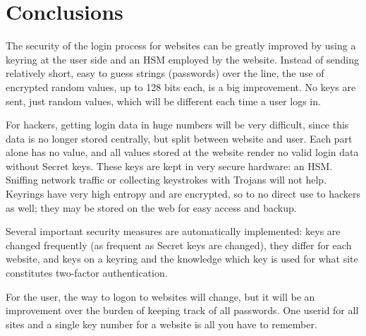 \section{Conclusions}
The security of the login process for websites can be greatly improved by using a keyring at the user side and an HSM employed by the website.
Instead of sending relatively short, easy to guess strings (passwords) over the line,
the use of encrypted random values,
up to 128 bits each,
is a big improvement.
No keys are sent,
just random values,
which will be different each time a user logs in.
\par
For hackers,
getting login data in huge numbers will be very difficult,
since this data is no longer stored centrally,
but split between website and user.
Each part alone has no value,
and all values stored at the website render no valid login data without Secret keys.
These keys are kept in very secure hardware: an HSM.
Sniffing network traffic
or collecting keystrokes with Trojans will not help.
Keyrings have very high entropy and are encrypted,
so to no direct use to hackers as well;
they may be stored on the web for easy access and backup.
\par
Several important security measures are automatically implemented:
keys are changed frequently
(as frequent as Secret keys are changed),
they differ for each website,
and keys on a keyring and the knowledge which key is used for what site constitutes two-factor authentication.
\par
For the user,
the way to logon to websites will change,
but it will be an improvement over the burden of keeping track of all passwords.
One userid for all sites and a single key number for a website is all you have to remember.

